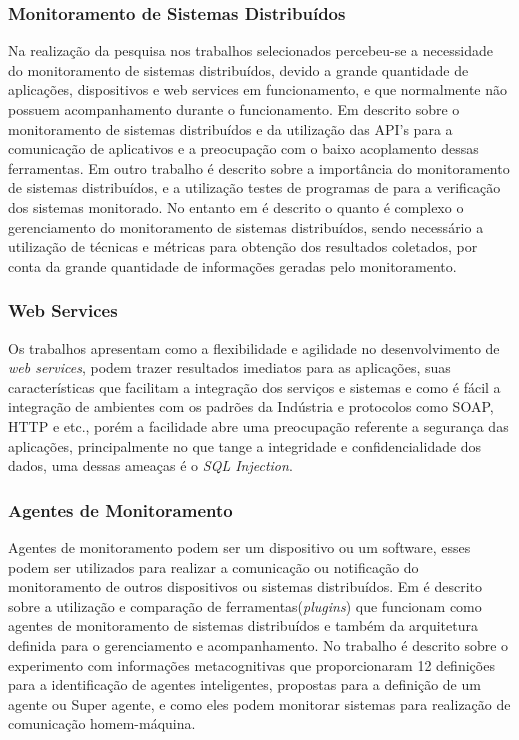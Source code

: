 \subsubsection{Monitoramento de Sistemas Distribuídos}
Na realização da pesquisa nos trabalhos selecionados percebeu-se a necessidade do monitoramento de sistemas distribuídos, devido a grande quantidade de  aplicações, dispositivos e web services em funcionamento, e que normalmente não possuem acompanhamento durante o funcionamento. Em \cite{cirstoiu2007monitoring} descrito sobre o monitoramento de sistemas distribuídos e da utilização das API's para a comunicação de aplicativos e a preocupação com o baixo acoplamento dessas ferramentas. Em outro trabalho \cite{joyce1987monitoring} é descrito sobre a importância do monitoramento de sistemas distribuídos, e a utilização testes de programas de para a verificação dos sistemas monitorado. No entanto em \cite{abdu1996monitoring} é descrito o quanto é complexo o gerenciamento do monitoramento de sistemas distribuídos, sendo necessário a utilização de técnicas e métricas para obtenção dos resultados coletados, por conta da grande quantidade de informações geradas pelo monitoramento.  

\subsubsection{Web Services}

Os trabalhos \cite{patil2012remote,casola2009sensim} apresentam como a flexibilidade e agilidade no desenvolvimento de \textit{web services}, podem trazer resultados imediatos para as aplicações, suas características que facilitam a integração dos serviços e sistemas e como é fácil a integração de ambientes com os padrões da Indústria e protocolos como SOAP, HTTP e etc., porém a facilidade abre uma preocupação referente a segurança das aplicações, principalmente no que tange a integridade e confidencialidade dos dados, uma dessas ameaças é o \textit{SQL Injection}. 

\subsubsection{Agentes de Monitoramento}

Agentes de monitoramento podem ser um dispositivo ou um software, esses podem ser utilizados para realizar a comunicação ou notificação do monitoramento de outros dispositivos ou sistemas distribuídos. Em \cite{smith2008flexible} é descrito sobre a utilização e comparação de ferramentas(\textit{plugins}) que funcionam como agentes de monitoramento de sistemas distribuídos e também da arquitetura definida para o gerenciamento e acompanhamento. No trabalho \cite{puatruct2010agent} é descrito sobre o experimento com informações metacognitivas que proporcionaram 12 definições para a identificação de agentes inteligentes, propostas para a definição de um agente ou Super agente, e como eles podem monitorar sistemas para realização de comunicação homem-máquina.

